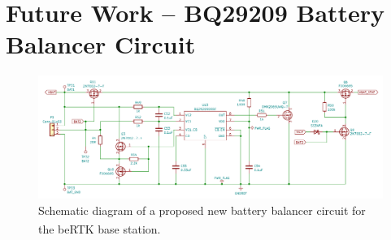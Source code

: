 

\chapter{Future Work -- BQ29209 Battery Balancer Circuit}\label{ann:NEW_BQ29209_circuit}

\begin{figure}[h]
    \centering
    \includegraphics[width=1.0\textwidth]{Chapters/Figures/chapter5/prototype/BQ29209_circuit_NEW.pdf}
    \caption{Schematic diagram of a proposed new battery balancer circuit for the beRTK\textsuperscript{\textregistered} base station.}
    \label{fig:BQ29209_circuit_NEW}
\end{figure}